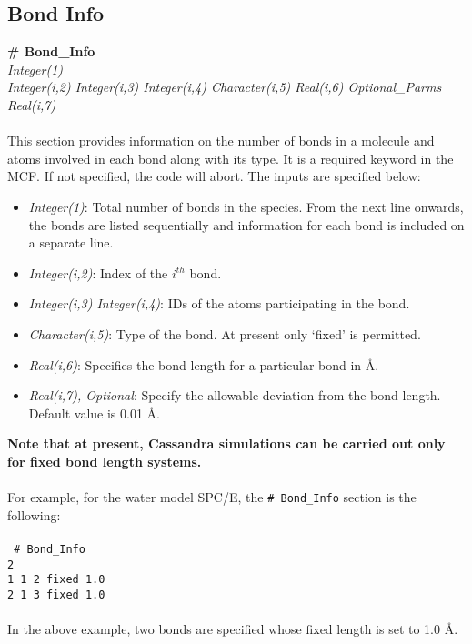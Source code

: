 \subsection{Bond Info}\label{sec:Get_Bond_Info}
%
{\bf \# Bond\_Info} \\
{\it Integer(1)} \\
{\it Integer(i,2) Integer(i,3) Integer(i,4) Character(i,5) Real(i,6) Optional\_Parms Real(i,7)} \\
\\
This section provides information on the number of bonds in a molecule
and atoms involved in each bond along with its type.  It is a required keyword in the MCF.
If not specified, the code will abort. The inputs are specified below: \\
%
\begin{itemize}

\item {\it Integer(1)}: Total number of bonds in the species. From the
next line onwards, the bonds are listed sequentially and information
for each bond is included on a separate line.
%
\item {\it Integer(i,2)}:  Index of the $i^{th}$ bond.
%
\item {\it Integer(i,3) Integer(i,4)}: IDs of the atoms participating in
the bond.
%
\item {\it Character(i,5)}: Type of the bond. At present only
`fixed' is  permitted.
\item {\it Real(i,6)}: Specifies the bond length for a particular bond in \AA.
\item {\it Real(i,7), Optional}: Specify the allowable deviation from
the bond length. Default value is 0.01 \AA.

\end{itemize}
%
{\bf Note that at present, Cassandra simulations can be carried out
  only for fixed bond length systems.} \\ \\
%
For example, for the water model SPC/E, the \texttt{\# Bond\_Info} section is the following: \\ \\
%
\texttt{
\# Bond\_Info \\
2 \\
1    1    2    fixed     1.0 \\
2    1    3    fixed     1.0 \\
} \\
%
In the above example, two bonds are specified whose fixed length is set to 1.0 \AA.

